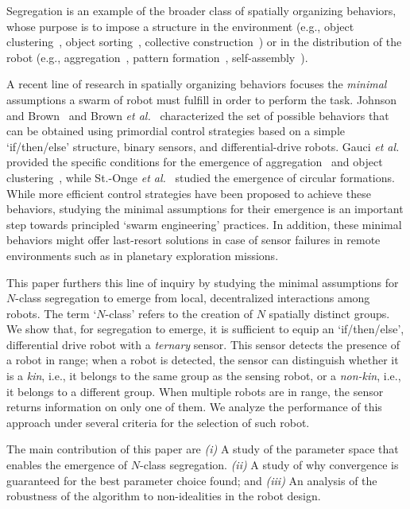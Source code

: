 \documentclass[conference]{IEEEtran}
\begin{document}
Segregation is an example of the broader class of spatially organizing
behaviors, whose purpose is to impose a structure in the environment (e.g.,
object clustering~\cite{}, object sorting~\cite{}, collective
construction~\cite{}) or in the distribution of the robot (e.g.,
aggregation~\cite{shlyakhov_survey_2017}, pattern formation~\cite{},
self-assembly~\cite{}).

A recent line of research in spatially organizing behaviors focuses the
\emph{minimal} assumptions a swarm of robot must fulfill in order to perform the
task. Johnson and Brown~\cite{johnson_evolving_2016} and Brown \emph{et
  al.}~\cite{brown_discovery_2018} characterized the set of possible behaviors
that can be obtained using primordial control strategies based on a simple
`if/then/else' structure, binary sensors, and differential-drive robots. Gauci
\emph{et al.} provided the specific conditions for the emergence of
aggregation~\cite{gauci_evolving_2014} and object
clustering~\cite{gauci_clustering_2014}, while St.-Onge \emph{et
  al.}~\cite{StOnge:IROS2018} studied the emergence of circular
formations. While more efficient control strategies have been proposed to
achieve these behaviors, studying the minimal assumptions for their emergence is
an important step towards principled `swarm engineering' practices. In addition,
these minimal behaviors might offer last-resort solutions in case of sensor
failures in remote environments such as in planetary exploration missions.

This paper furthers this line of inquiry by studying the minimal assumptions for
$N$-class segregation to emerge from local, decentralized interactions among
robots. The term `$N$-class' refers to the creation of $N$ spatially distinct
groups. We show that, for segregation to emerge, it is sufficient to equip an
`if/then/else', differential drive robot with a \emph{ternary} sensor. This
sensor detects the presence of a robot in range; when a robot is detected, the
sensor can distinguish whether it is a \emph{kin}, i.e., it belongs to the same
group as the sensing robot, or a \emph{non-kin}, i.e., it belongs to a different
group. When multiple robots are in range, the sensor returns information on only
one of them. We analyze the performance of this approach under several criteria
for the selection of such robot.

The main contribution of this paper are \emph{(i)} A study of the parameter
space that enables the emergence of $N$-class segregation. \emph{(ii)} A study
of why convergence is guaranteed for the best parameter choice found; and
\emph{(iii)} An analysis of the robustness of the algorithm to non-idealities in
the robot design.
\end{document}
